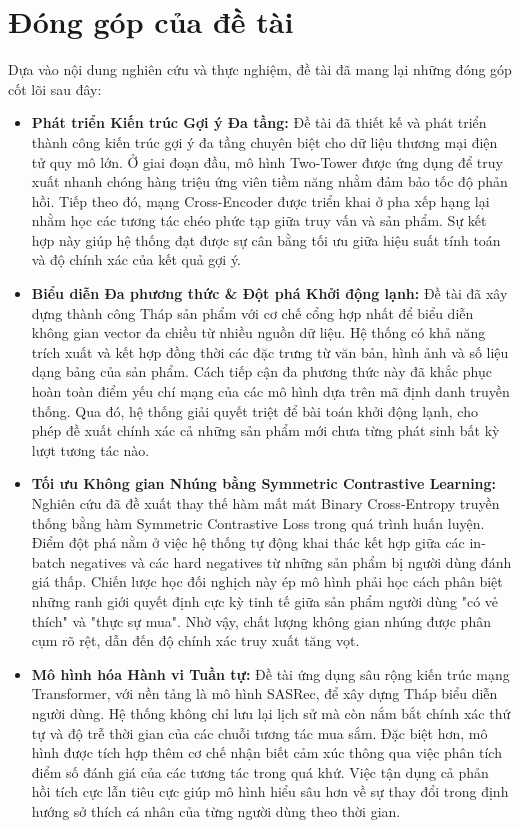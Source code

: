 \section{Đóng góp của đề tài}

Dựa vào nội dung nghiên cứu và thực nghiệm, đề tài đã mang lại những đóng góp cốt lõi sau đây:

\begin{itemize}
    \item \textbf{Phát triển Kiến trúc Gợi ý Đa tầng:} Đề tài đã thiết kế và phát triển thành công kiến trúc gợi ý đa tầng chuyên biệt cho dữ liệu thương mại điện tử quy mô lớn. Ở giai đoạn đầu, mô hình Two-Tower được ứng dụng để truy xuất nhanh chóng hàng triệu ứng viên tiềm năng nhằm đảm bảo tốc độ phản hồi. Tiếp theo đó, mạng Cross-Encoder được triển khai ở pha xếp hạng lại nhằm học các tương tác chéo phức tạp giữa truy vấn và sản phẩm. Sự kết hợp này giúp hệ thống đạt được sự cân bằng tối ưu giữa hiệu suất tính toán và độ chính xác của kết quả gợi ý.
    
    \item \textbf{Biểu diễn Đa phương thức \& Đột phá Khởi động lạnh:} Đề tài đã xây dựng thành công Tháp sản phẩm với cơ chế cổng hợp nhất để biểu diễn không gian vector đa chiều từ nhiều nguồn dữ liệu. Hệ thống có khả năng trích xuất và kết hợp đồng thời các đặc trưng từ văn bản, hình ảnh và số liệu dạng bảng của sản phẩm. Cách tiếp cận đa phương thức này đã khắc phục hoàn toàn điểm yếu chí mạng của các mô hình dựa trên mã định danh truyền thống. Qua đó, hệ thống giải quyết triệt để bài toán khởi động lạnh, cho phép đề xuất chính xác cả những sản phẩm mới chưa từng phát sinh bất kỳ lượt tương tác nào.
    
    \item \textbf{Tối ưu Không gian Nhúng bằng Symmetric Contrastive Learning:} Nghiên cứu đã đề xuất thay thế hàm mất mát Binary Cross-Entropy truyền thống bằng hàm Symmetric Contrastive Loss trong quá trình huấn luyện. Điểm đột phá nằm ở việc hệ thống tự động khai thác kết hợp giữa các in-batch negatives và các hard negatives từ những sản phẩm bị người dùng đánh giá thấp. Chiến lược học đối nghịch này ép mô hình phải học cách phân biệt những ranh giới quyết định cực kỳ tinh tế giữa sản phẩm người dùng "có vẻ thích" và "thực sự mua". Nhờ vậy, chất lượng không gian nhúng được phân cụm rõ rệt, dẫn đến độ chính xác truy xuất tăng vọt.
    
    \item \textbf{Mô hình hóa Hành vi Tuần tự:} Đề tài ứng dụng sâu rộng kiến trúc mạng Transformer, với nền tảng là mô hình SASRec, để xây dựng Tháp biểu diễn người dùng. Hệ thống không chỉ lưu lại lịch sử mà còn nắm bắt chính xác thứ tự và độ trễ thời gian của các chuỗi tương tác mua sắm. Đặc biệt hơn, mô hình được tích hợp thêm cơ chế nhận biết cảm xúc thông qua việc phân tích điểm số đánh giá của các tương tác trong quá khứ. Việc tận dụng cả phản hồi tích cực lẫn tiêu cực giúp mô hình hiểu sâu hơn về sự thay đổi trong định hướng sở thích cá nhân của từng người dùng theo thời gian.
    

\end{itemize}
